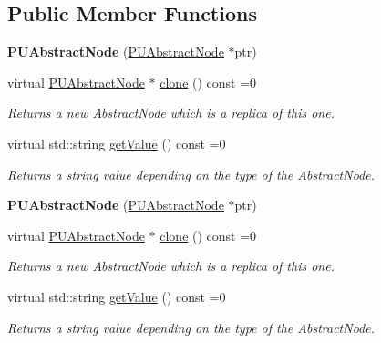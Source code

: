 \subsection*{Public Member Functions}
\begin{DoxyCompactItemize}
\item 
\mbox{\label{classPUAbstractNode_a3339ecfdffbc9ebf2b7640b5762d1db1}} 
{\bfseries P\+U\+Abstract\+Node} (\hyperlink{classPUAbstractNode}{P\+U\+Abstract\+Node} $\ast$ptr)
\item 
\mbox{\label{classPUAbstractNode_ae359fe7ffa2c3f92dafe45eab2a799ac}} 
virtual \hyperlink{classPUAbstractNode}{P\+U\+Abstract\+Node} $\ast$ \hyperlink{classPUAbstractNode_ae359fe7ffa2c3f92dafe45eab2a799ac}{clone} () const =0
\begin{DoxyCompactList}\small\item\em Returns a new Abstract\+Node which is a replica of this one. \end{DoxyCompactList}\item 
\mbox{\label{classPUAbstractNode_a5b3ae97b60e82783649fb75e09ff9d59}} 
virtual std\+::string \hyperlink{classPUAbstractNode_a5b3ae97b60e82783649fb75e09ff9d59}{get\+Value} () const =0
\begin{DoxyCompactList}\small\item\em Returns a string value depending on the type of the Abstract\+Node. \end{DoxyCompactList}\item 
\mbox{\label{classPUAbstractNode_a3339ecfdffbc9ebf2b7640b5762d1db1}} 
{\bfseries P\+U\+Abstract\+Node} (\hyperlink{classPUAbstractNode}{P\+U\+Abstract\+Node} $\ast$ptr)
\item 
\mbox{\label{classPUAbstractNode_ae359fe7ffa2c3f92dafe45eab2a799ac}} 
virtual \hyperlink{classPUAbstractNode}{P\+U\+Abstract\+Node} $\ast$ \hyperlink{classPUAbstractNode_ae359fe7ffa2c3f92dafe45eab2a799ac}{clone} () const =0
\begin{DoxyCompactList}\small\item\em Returns a new Abstract\+Node which is a replica of this one. \end{DoxyCompactList}\item 
\mbox{\label{classPUAbstractNode_a5b3ae97b60e82783649fb75e09ff9d59}} 
virtual std\+::string \hyperlink{classPUAbstractNode_a5b3ae97b60e82783649fb75e09ff9d59}{get\+Value} () const =0
\begin{DoxyCompactList}\small\item\em Returns a string value depending on the type of the Abstract\+Node. \end{DoxyCompactList}\end{DoxyCompactItemize}
